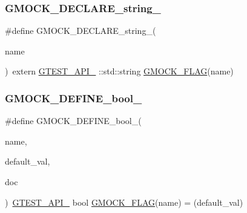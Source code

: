\subsubsection{\texorpdfstring{GMOCK\_DECLARE\_string\_}{GMOCK\_DECLARE\_string\_}}
{\footnotesize\ttfamily \#define G\+M\+O\+C\+K\+\_\+\+D\+E\+C\+L\+A\+R\+E\+\_\+string\+\_\+(\begin{DoxyParamCaption}\item[{}]{name }\end{DoxyParamCaption})~extern \mbox{\hyperlink{_obj__test_2lib_2googletest-release-1_88_81_2googletest_2include_2gtest_2internal_2gtest-port_8h_aa73be6f0ba4a7456180a94904ce17790}{G\+T\+E\+S\+T\+\_\+\+A\+P\+I\+\_\+}} \+::std\+::string \mbox{\hyperlink{_obj__test_2lib_2googletest-release-1_88_81_2googlemock_2include_2gmock_2internal_2gmock-port_8h_ad7119adfef06be5e7b1551633f5a1436}{G\+M\+O\+C\+K\+\_\+\+F\+L\+AG}}(name)}

\mbox{\label{_obj__test_2lib_2googletest-master_2googlemock_2include_2gmock_2internal_2gmock-port_8h_a470be328fabbeef3987127adc18a1433}} 
\subsubsection{\texorpdfstring{GMOCK\_DEFINE\_bool\_}{GMOCK\_DEFINE\_bool\_}}
{\footnotesize\ttfamily \#define G\+M\+O\+C\+K\+\_\+\+D\+E\+F\+I\+N\+E\+\_\+bool\+\_\+(\begin{DoxyParamCaption}\item[{}]{name,  }\item[{}]{default\+\_\+val,  }\item[{}]{doc }\end{DoxyParamCaption})~\mbox{\hyperlink{_obj__test_2lib_2googletest-release-1_88_81_2googletest_2include_2gtest_2internal_2gtest-port_8h_aa73be6f0ba4a7456180a94904ce17790}{G\+T\+E\+S\+T\+\_\+\+A\+P\+I\+\_\+}} bool \mbox{\hyperlink{_obj__test_2lib_2googletest-release-1_88_81_2googlemock_2include_2gmock_2internal_2gmock-port_8h_ad7119adfef06be5e7b1551633f5a1436}{G\+M\+O\+C\+K\+\_\+\+F\+L\+AG}}(name) = (default\+\_\+val)}

\mbox{\label{_obj__test_2lib_2googletest-master_2googlemock_2include_2gmock_2internal_2gmock-port_8h_a19d91081ff0aaab2f60ef1dc2d6e6b34}} 

